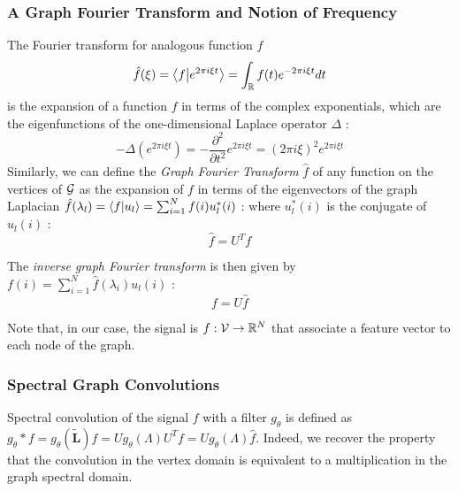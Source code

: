 \subsubsection{A Graph Fourier Transform and Notion of Frequency}
The Fourier transform for analogous function $f$
$$
\hat{f}(\xi) = \left \langle f \middle| e^{2\pi i\xi t} \right \rangle = \int_{\mathbb{R}} f(t)e^{-2\pi i \xi t}dt
$$
is the expansion of a function $f$ in terms of the complex exponentials, which are the eigenfunctions of the one-dimensional Laplace operator $\Delta$ :
$$
-\Delta (e^{2\pi i \xi t}) = -\frac{\partial^2}{\partial t^2} e^{2\pi i \xi t} = (2\pi i\xi)^2 e^{2\pi i \xi t}
$$
Similarly, we can define the \textit{Graph Fourier Transform} $\hat{f}$ of any function on the vertices of $\mathcal{G}$ as the expansion of $f$ in terms of the eigenvectors of the graph Laplacian $\hat{f}(\lambda_l) = \left \langle f \middle| u_l \right \rangle = \sum_{i=1}^{N} f(i)u_l^*(i)$ : 
where $u_l^*(i)$ is the conjugate of $u_l(i)$ : 
\begin{equation}
    \hat{f} = U^Tf
\end{equation}

The \textit{inverse graph Fourier transform} is then given by $f(i) = \sum_{i=1}^{N} \hat{f}(\lambda_i)u_l(i)$ : 
\begin{equation}
    f = U\hat{f}
\end{equation}

Note that, in our case, the signal is $f:\mathcal{V}\rightarrow\mathbb{R}^N$ that associate a feature vector to each node of the graph.

\subsubsection{Spectral Graph Convolutions}

Spectral convolution of the signal $f$ with a filter $g_\theta$ is defined as $g_\theta * f = g_\theta(\widetilde{\mathbf{L}})f = Ug_\theta(\Lambda)U^Tf = U g_\theta(\Lambda)\hat{f}$. 
Indeed, we recover the property that the convolution in the vertex domain is equivalent to a multiplication in the graph spectral domain.

